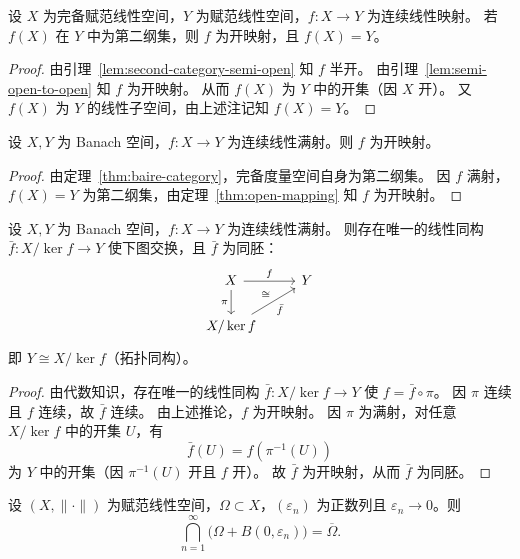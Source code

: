 \documentclass[lang=cn,a4paper,newtx,section]{elegantbook}
\begin{document}
\begin{theorem}[开映射定理]\label{thm:open-mapping}
  设 $X$ 为完备赋范线性空间，$Y$ 为赋范线性空间，$f:X\to Y$ 为连续线性映射。
  若 $f(X)$ 在 $Y$ 中为第二纲集，则 $f$ 为开映射，且 $f(X)=Y$。
\end{theorem}

\begin{proof}
  由引理~\ref{lem:second-category-semi-open} 知 $f$ 半开。
  由引理~\ref{lem:semi-open-to-open} 知 $f$ 为开映射。
  从而 $f(X)$ 为 $Y$ 中的开集（因 $X$ 开）。
  又 $f(X)$ 为 $Y$ 的线性子空间，由上述注记知 $f(X)=Y$。
\end{proof}

\begin{corollary}
  设 $X,Y$ 为 Banach 空间，$f:X\to Y$ 为连续线性满射。则 $f$ 为开映射。
\end{corollary}

\begin{proof}
  由定理~\ref{thm:baire-category}，完备度量空间自身为第二纲集。
  因 $f$ 满射，$f(X)=Y$ 为第二纲集，由定理~\ref{thm:open-mapping} 知 $f$ 为开映射。
\end{proof}

\begin{theorem}[商空间同构定理]
  设 $X,Y$ 为 Banach 空间，$f:X\to Y$ 为连续线性满射。
  则存在唯一的线性同构 $\bar{f}:X/\ker f\to Y$ 使下图交换，且 $\bar{f}$ 为同胚：
  \[
    \begin{tikzcd}
      X \arrow[r,"f"] \arrow[d,"\pi"'] & Y \\
      X/\ker f \arrow[ur,"\bar{f}"',"\cong"]
    \end{tikzcd}
  \]
  即 $Y\cong X/\ker f$（拓扑同构）。
\end{theorem}

\begin{proof}
  由代数知识，存在唯一的线性同构 $\bar{f}:X/\ker f\to Y$ 使 $f=\bar{f}\circ\pi$。
  因 $\pi$ 连续且 $f$ 连续，故 $\bar{f}$ 连续。
  由上述推论，$f$ 为开映射。
  因 $\pi$ 为满射，对任意 $X/\ker f$ 中的开集 $U$，有
  \[
    \bar{f}(U)=f(\pi^{-1}(U))
  \]
  为 $Y$ 中的开集（因 $\pi^{-1}(U)$ 开且 $f$ 开）。
  故 $\bar{f}$ 为开映射，从而 $\bar{f}$ 为同胚。
\end{proof}

\begin{proposition}\label{prop:closure-epsilon-intersection}
  设 $(X,\|\cdot\|)$ 为赋范线性空间，$\Omega\subset X$，$(\varepsilon_n)$ 为正数列且 $\varepsilon_n\to 0$。则
  \[
    \bigcap_{n=1}^{\infty}\bigl(\Omega+B(0,\varepsilon_n)\bigr)=\overline{\Omega}.
  \]
\end{proposition}
\end{document}
